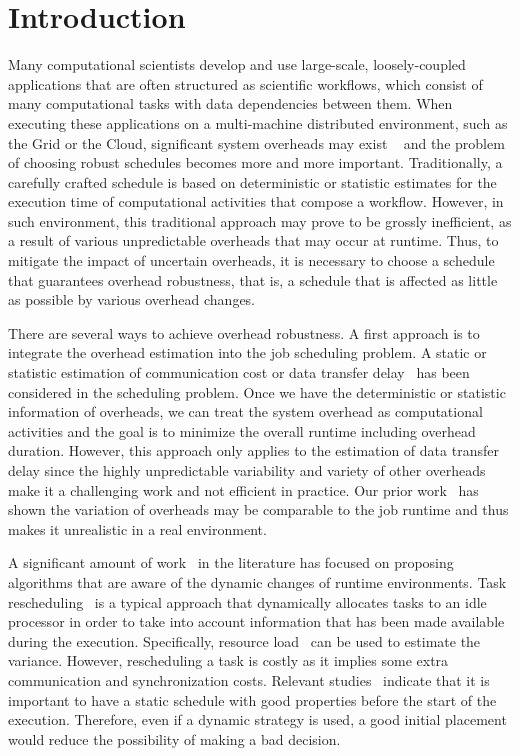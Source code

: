 \documentclass[final]{IEEEtran}
\begin{document}
\IEEEpeerreviewmaketitle


\section{Introduction}

Many computational scientists develop and use large-scale, loosely-coupled applications that are often structured as scientific workflows, which consist of many computational tasks with data dependencies between them. When executing these applications on a multi-machine distributed environment, such as the Grid or the Cloud, significant system overheads may exist ~\cite{Chen} and the problem of choosing robust schedules becomes more and more important. Traditionally, a carefully crafted schedule is based on deterministic or statistic estimates for the execution time of computational activities that compose a workflow. However, in such environment, this traditional approach may prove to be grossly inefficient, as a result of various unpredictable overheads that may occur at runtime. 
Thus, to mitigate the impact of uncertain overheads, it is necessary to choose a schedule that guarantees overhead robustness, that is, a schedule that is affected as little as possible by various overhead changes.  

There are several ways to achieve overhead robustness. A first approach is to integrate the overhead estimation into the job scheduling problem. A static or statistic estimation of communication cost or data transfer delay~\cite{Dong2010, Yang03} has been considered in the scheduling problem. Once we have the deterministic or statistic information of overheads, we can treat the system overhead as computational activities and the goal is to minimize the overall runtime including overhead duration. However, this approach only applies to the estimation of data transfer delay since the highly unpredictable variability and variety of other overheads make it a challenging work and not efficient in practice. Our prior work~\cite{Chen} has shown the variation of overheads may be comparable to the job runtime and thus makes it unrealistic in a real environment.  

A significant amount of work~\cite{Ahmad1998, Chetto1990, Dong2010, Yang03} in the literature has focused on proposing algorithms that are aware of the dynamic changes of runtime environments. Task rescheduling~\cite{Sakellariou2004, Zhang2009} is a typical approach that dynamically allocates tasks to an idle processor in order to take into account information that has been made available during the execution. Specifically, resource load~\cite{Dong2010} can be used to estimate the variance. However, rescheduling a task is costly as it implies some extra communication and synchronization costs. Relevant studies~\cite{Sakellariou2004} indicate that it is important to have a static schedule with good properties before the start of the execution. Therefore, even if a dynamic strategy is used, a good initial placement would reduce the possibility of making a bad decision. 
\end{document}
